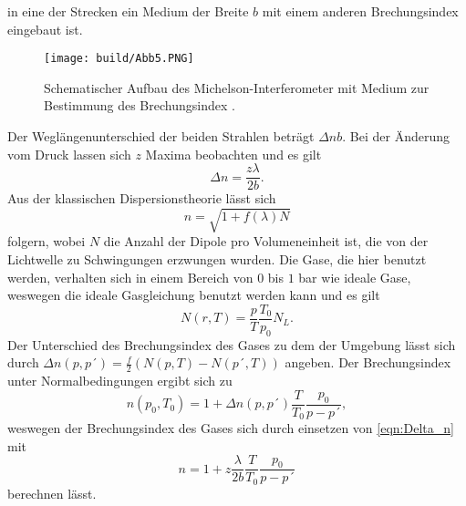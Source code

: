 in eine der Strecken ein Medium der Breite $b$ mit einem anderen Brechungsindex eingebaut ist.
\begin{figure}[H]
    \centering
    \texttt{[image: build/Abb5.PNG]}
    \caption {Schematischer Aufbau des Michelson-Interferometer mit Medium zur Bestimmung des Brechungsindex \cite[3]{V401}.}
    \label{fig:Abb5}
\end{figure}
Der Weglängenunterschied der beiden Strahlen beträgt $\Delta n b$. 
Bei der Änderung vom Druck lassen sich $z$ Maxima beobachten und es gilt
\begin{equation}
    \Delta n =\frac{z \lambda}{2b}.
    \label{eqn:Delta_n}
\end{equation}
Aus der klassischen Dispersionstheorie lässt sich
\begin{equation*}
    n = \sqrt{1 + f(\lambda)N}
\end{equation*}
folgern, wobei $N$ die Anzahl der Dipole pro Volumeneinheit ist, die von der Lichtwelle zu Schwingungen erzwungen wurden.
Die Gase, die hier benutzt werden, verhalten sich in einem Bereich von $0$ bis $1$ bar wie ideale Gase, weswegen die ideale Gasgleichung benutzt werden kann und es gilt
\begin{equation*}
    N(r,T) = \frac{p}{T}\frac{T_0}{p_0}N_L.
\end{equation*}
Der Unterschied des Brechungsindex des Gases zu dem der Umgebung lässt sich durch $\Delta n(p,p´) = \frac{f}{2}(N(p,T)-N(p´,T))$ angeben.
Der Brechungsindex unter Normalbedingungen ergibt sich zu 
\begin{equation}
    n(p_0,T_0) = 1 + \Delta n(p,p´)\frac{T}{T_0}\frac{p_0}{p-p´},
    \label{eqn:Normalbedingungen}
\end{equation}
weswegen der Brechungsindex des Gases sich durch einsetzen von \autoref{eqn:Delta_n} mit
\begin{equation}
    n = 1 + z \frac{\lambda}{2b} \frac{T}{T_0} \frac{p_0}{p-p´}
    \label{eqn:n}
\end{equation}
berechnen lässt.